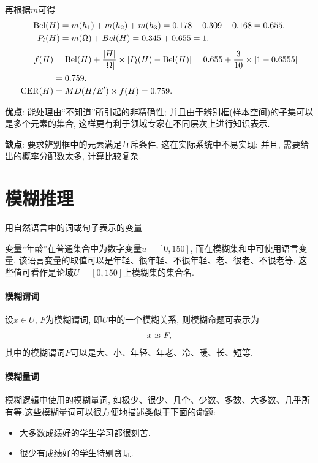 再根据$m$可得
\begin{align*}
\textup{Bel}(H)&=m({h_1})+m({h_2})+m({h_3})=0.178+0.309+0.168=0.655.\\
P_l(H)&=m(\Omega)+Bel(H)=0.345+0.655=1.
\end{align*}
\begin{align*}
  \begin{aligned}
  f(H) &=\operatorname{Bel}(H)+\frac{|H|}{|\Omega|} \times[P_l(H)-\operatorname{Bel}(H)]=0.655+\frac{3}{10} \times[1-0.6555] \\
       &=0.759.\\
  \textup{CER}(H)&=MD(H/E')\times f(H)=0.759.
  \end{aligned}
\end{align*}

\textbf{优点}: 能处理由“不知道”所引起的非精确性; 并且由于辨别框(样本空间)的子集可以是多个元素的集合, 这样更有利于领域专家在不同层次上进行知识表示.

\textbf{缺点}: 要求辨别框中的元素满足互斥条件, 这在实际系统中不易实现; 并且, 需要给出的概率分配数太多, 计算比较复杂.

\section{模糊推理}
用自然语言中的词或句子表示的变量
\begin{example}
变量“年龄”在普通集合中为数字变量$u=[0, 150]$, 而在模糊集和中可使用语言变量, 该语言变量的取值可以是年轻、很年轻、不很年轻、老、很老、不很老等. 这些值可看作是论域$U=[0, 150]$上模糊集的集合名.
\end{example}
\paragraph{模糊谓词}
设$x\in U$, $F$为模糊谓词, 即$U$中的一个模糊关系, 则模糊命题可表示为
 \begin{align}
   x\,\,  \textup{is} \,\, F,
 \end{align}
其中的模糊谓词$F$可以是大、小、年轻、年老、冷、暖、长、短等.
\paragraph{模糊量词}
模糊逻辑中使用的模糊量词, 如极少、很少、几个、少数、多数、大多数、几乎所有等.这些模糊量词可以很方便地描述类似于下面的命题:
\begin{itemize}
\item 大多数成绩好的学生学习都很刻苦.
\item 很少有成绩好的学生特别贪玩.
\end{itemize}

